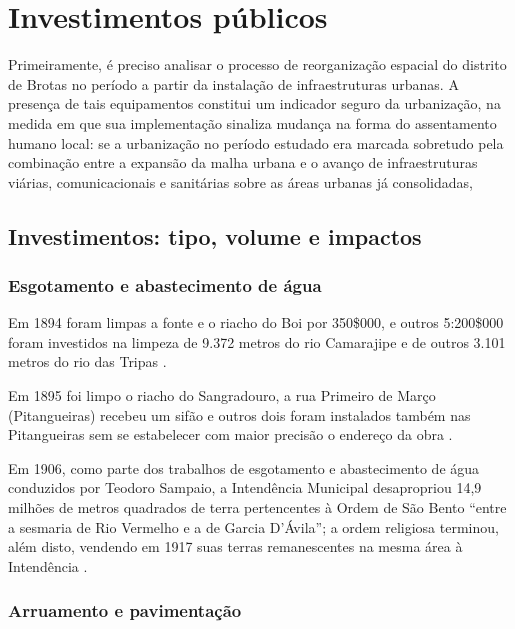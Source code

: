 \section{Investimentos públicos}\label{sec:3.1}

Primeiramente, é preciso analisar o processo de reorganização espacial do distrito de Brotas no período a partir da instalação de infraestruturas urbanas. A presença de tais equipamentos constitui um indicador seguro da urbanização, na medida em que sua implementação sinaliza mudança na forma do assentamento humano local: se a urbanização no período estudado era marcada sobretudo pela combinação entre a expansão da malha urbana e o avanço de infraestruturas viárias, comunicacionais e sanitárias sobre as áreas urbanas já consolidadas, 

\subsection{Investimentos: tipo, volume e impactos}\label{investbrotas}

\subsubsection{Esgotamento e abastecimento de água}

Em 1894 foram limpas a fonte e o riacho do Boi por 350\$000, e outros 5:200\$000 foram investidos na limpeza de 9.372 metros do rio Camarajipe e de outros 3.101 metros do rio das Tripas \cite[p.~156]{salvador_relatorio_1894}.

Em 1895 foi limpo o riacho do Sangradouro, a rua Primeiro de Março (Pitangueiras) recebeu um sifão e outros dois foram instalados também nas Pitangueiras sem se estabelecer com maior precisão o endereço da obra \cite[pp.~20, 137-138]{salvador_relatorio_1896}. 


Em 1906, como parte dos trabalhos de esgotamento e abastecimento de água conduzidos por Teodoro Sampaio, a Intendência Municipal desapropriou 14,9 milhões de metros quadrados de terra pertencentes à Ordem de São Bento ``entre a sesmaria de Rio Vermelho e a de Garcia D'Ávila''; a ordem religiosa terminou, além disto, vendendo em 1917 suas terras remanescentes na mesma área à Intendência \cite[p.~306]{VASCONCELOS2002}.


\subsubsection{Arruamento e pavimentação}

